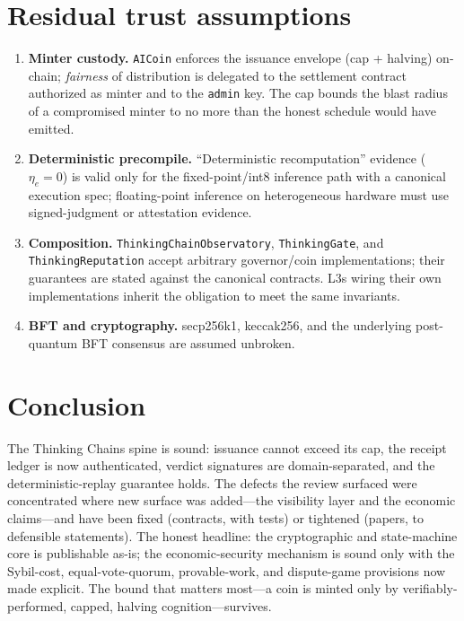 \documentclass[11pt]{article}
\begin{document}
\section{Residual trust assumptions}

\begin{enumerate}[leftmargin=1.4em]
\item \textbf{Minter custody.} \texttt{AICoin} enforces the issuance envelope
(cap + halving) on-chain; \emph{fairness} of distribution is delegated to the
settlement contract authorized as minter and to the \texttt{admin} key. The cap
bounds the blast radius of a compromised minter to no more than the honest
schedule would have emitted.
\item \textbf{Deterministic precompile.} ``Deterministic recomputation''
evidence ($\eta_e=0$) is valid only for the fixed-point/int8 inference path with
a canonical execution spec; floating-point inference on heterogeneous hardware
must use signed-judgment or attestation evidence.
\item \textbf{Composition.} \texttt{ThinkingChainObservatory},
\texttt{ThinkingGate}, and \texttt{ThinkingReputation} accept arbitrary
governor/coin implementations; their guarantees are stated against the canonical
contracts. L3s wiring their own implementations inherit the obligation to meet
the same invariants.
\item \textbf{BFT and cryptography.} secp256k1, keccak256, and the underlying
post-quantum BFT consensus are assumed unbroken.
\end{enumerate}

\section{Conclusion}

The Thinking Chains spine is sound: issuance cannot exceed its cap, the receipt
ledger is now authenticated, verdict signatures are domain-separated, and the
deterministic-replay guarantee holds. The defects the review surfaced were
concentrated where new surface was added---the visibility layer and the economic
claims---and have been fixed (contracts, with tests) or tightened (papers, to
defensible statements). The honest headline: the cryptographic and
state-machine core is publishable as-is; the economic-security mechanism is sound
only with the Sybil-cost, equal-vote-quorum, provable-work, and dispute-game
provisions now made explicit. The bound that matters most---a coin is minted only
by verifiably-performed, capped, halving cognition---survives.
\end{document}
